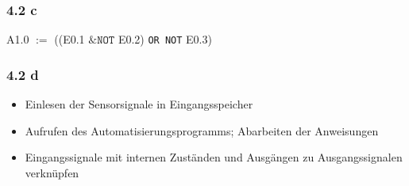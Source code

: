 \documentclass[a4paper]{scrartcl}
\begin{document}
  \subsubsection*{4.2 c}
  A1.0 $:=$ ((E0.1 $\&\texttt{NOT}$ E0.2)  \texttt{OR NOT} E0.3)

  \subsubsection*{4.2 d}
  \begin{itemize}
	\item Einlesen der Sensorsignale in Eingangsspeicher
	\item Aufrufen des Automatisierungsprogramms; Abarbeiten der Anweisungen
	\item Eingangssignale mit internen Zuständen und Ausgängen zu Ausgangssignalen verknüpfen
  \end{itemize}
\end{document}
